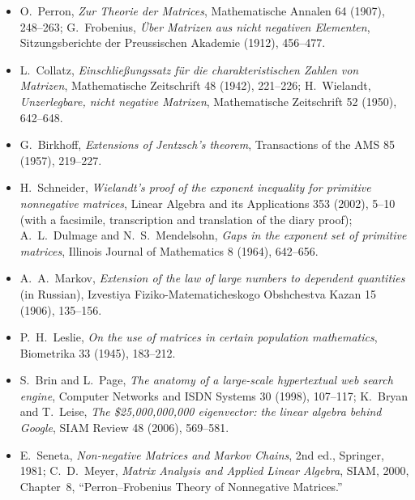 \begin{itemize}
\item O.~Perron, \emph{Zur Theorie der Matrices}, Mathematische Annalen 64 (1907), 248--263; G.~Frobenius, \emph{\"Uber Matrizen aus
nicht negativen Elementen}, Sitzungsberichte der Preussischen Akademie (1912), 456--477.
\item L.~Collatz, \emph{Einschlie\ss ungssatz f\"ur die charakteristischen Zahlen von Matrizen}, Mathematische Zeitschrift 48
(1942), 221--226; H.~Wielandt, \emph{Unzerlegbare, nicht negative Matrizen}, Mathematische Zeitschrift 52 (1950), 642--648.
\item G.~Birkhoff, \emph{Extensions of Jentzsch's theorem}, Transactions of the AMS 85 (1957), 219--227.
\item H.~Schneider, \emph{Wielandt's proof of the exponent inequality for primitive nonnegative matrices}, Linear Algebra and its
Applications 353 (2002), 5--10 (with a facsimile, transcription and translation of the diary proof); A.~L.~Dulmage and
N.~S.~Mendelsohn, \emph{Gaps in the exponent set of primitive matrices}, Illinois Journal of Mathematics 8 (1964), 642--656.
\item A.~A.~Markov, \emph{Extension of the law of large numbers to dependent quantities} (in Russian), Izvestiya
Fiziko-Matematicheskogo Obshchestva Kazan 15 (1906), 135--156.
\item P.~H.~Leslie, \emph{On the use of matrices in certain population mathematics}, Biometrika 33 (1945), 183--212.
\item S.~Brin and L.~Page, \emph{The anatomy of a large-scale hypertextual web search engine}, Computer Networks and ISDN Systems
30 (1998), 107--117; K.~Bryan and T.~Leise, \emph{The \$25{,}000{,}000{,}000 eigenvector: the linear algebra behind Google},
SIAM Review 48 (2006), 569--581.
\item E.~Seneta, \emph{Non-negative Matrices and Markov Chains}, 2nd ed., Springer, 1981; C.~D.~Meyer, \emph{Matrix Analysis and
Applied Linear Algebra}, SIAM, 2000, Chapter~8, ``Perron--Frobenius Theory of Nonnegative Matrices.''
\end{itemize}
